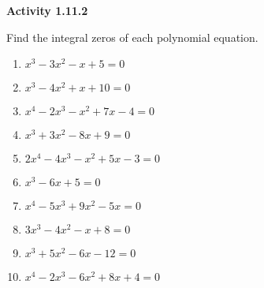 \vspace{0.3ex}
\noindent\textbf{Activity 1.11.2}

\vspace{0.2ex}

Find the integral zeros of each polynomial equation.
\begin{enumerate}
    \item $x^3 - 3x^2 - x + 5 = 0$
    \item $x^3 - 4x^2 + x + 10 = 0$
    \item $x^4 - 2x^3 - x^2 + 7x - 4 = 0$
    \item $x^3 + 3x^2 - 8x + 9 = 0$
    \item $2x^4 - 4x^3 - x^2 + 5x - 3 = 0$
    \item $x^3 - 6x + 5 = 0$
    \item $x^4 - 5x^3 + 9x^2 - 5x = 0$
    \item $3x^3 - 4x^2 - x + 8 = 0$
    \item $x^3 + 5x^2 - 6x - 12 = 0$
    \item $x^4 - 2x^3 - 6x^2 + 8x + 4 = 0$
\end{enumerate}
